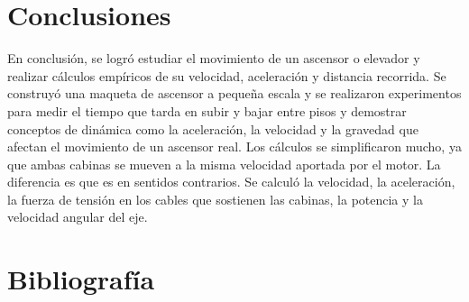 \documentclass{article}
\theoremstyle{mytheoremstyle}
\theoremstyle{mytheoremstyle}
\theoremstyle{myproblemstyle}
\begin{document}
    \section*{Conclusiones}
    En conclusión, se logró estudiar el movimiento de un ascensor o elevador y realizar cálculos empíricos de su velocidad, aceleración y distancia recorrida. Se construyó una maqueta de ascensor a pequeña escala y se realizaron experimentos para medir el tiempo que tarda en subir y bajar entre pisos y demostrar conceptos de dinámica como la aceleración, la velocidad y la gravedad que afectan el movimiento de un ascensor real. Los cálculos se simplificaron mucho, ya que ambas cabinas se mueven a la misma velocidad aportada por el motor. La diferencia es que es en sentidos contrarios. Se calculó la velocidad, la aceleración, la fuerza de tensión en los cables que sostienen las cabinas, la potencia y la velocidad angular del eje.
    
    \newpage
   
    \section*{Bibliografía}
    \printbibliography 
\end{document}
